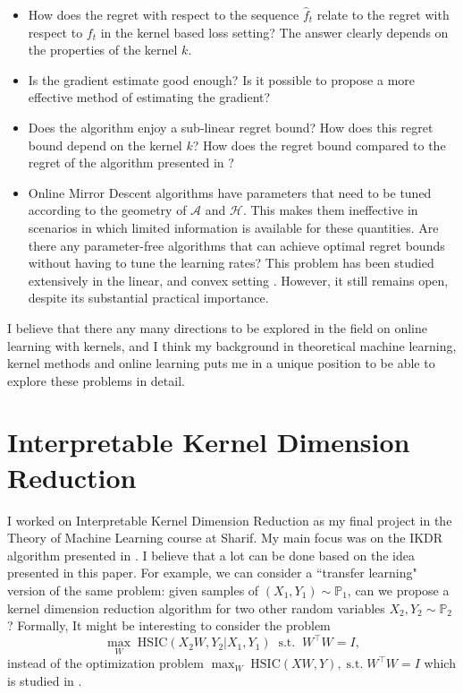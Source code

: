 \documentclass[]{article}
\newcommand{\cA}{\mathcal{A}}
\newcommand{\cH}{\mathcal{H}}
\begin{document}
\begin{itemize}
\item How does the regret with respect to the sequence $\widehat f_t$ relate to the regret with respect to $f_t$ in the kernel based loss setting? The answer clearly depends on the properties of the kernel $k$. 
\item Is the gradient estimate good enough? Is it possible to propose a more effective method of estimating the gradient? 
\item Does the algorithm enjoy a sub-linear regret bound? How does this regret bound depend on the kernel $k$? How does the regret bound compared to the regret of the algorithm presented in \cite{Pacchiano2019}?

\item Online Mirror Descent algorithms have parameters that need to be tuned according to the geometry of $\cA$ and $\cH$. This makes them ineffective in scenarios in which limited information is available for these quantities. Are there any parameter-free algorithms that can achieve optimal regret bounds without having to tune the learning rates? This problem has been studied extensively in the linear, and convex setting \cite{parameter2016}. However, it still remains open, despite its substantial practical importance.


\end{itemize}

I believe that there any many directions to be explored in the field on online learning with kernels, and I think my background in theoretical machine learning, kernel methods and online learning puts me in a unique position to be able to explore these problems in detail. 
\section{Interpretable Kernel Dimension Reduction}

I worked on Interpretable Kernel Dimension Reduction as my final project in the Theory of Machine Learning course at Sharif. My main focus was on the IKDR algorithm presented in \cite{wu2019solving}. I believe that a lot can be done based on the idea presented in this paper. For example, we can consider a ``transfer learning" version of the same problem:  given samples of $(X_1, Y_1)\sim \mathbb{P}_1$, can we propose a kernel dimension reduction algorithm for two other random variables $X_2, Y_2\sim \mathbb{P}_2$? Formally, It might be interesting to consider the problem
\begin{equation*}
\max_W \; \mathrm{HSIC}(X_2W, Y_2|X_1, Y_1) \;\; \mathrm{s.t.} \;\; W^\top W = I,
\end{equation*}
instead of the optimization problem $\max_W\; \mathrm{HSIC}(XW, Y), \; \mathrm{s.t.} \; W^\top W = I$ which is studied in \cite{wu2019solving}.
\end{document}

